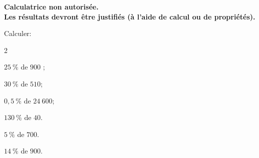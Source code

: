 \documentclass[11pt,a4paper]{article}  %
\begin{document}
	\graphicspath{{images/}}
	
	
	\vspace{.5cm}
	
	\begin{center}
		
		
	\end{center}

\begin{center}\textbf{Calculatrice non autorisée.\\Les résultats devront être justifiés (à l'aide de calcul ou de propriétés).}\end{center}




Calculer:
\begin{multicols}{2}
	\begin{enumMet}
		\item $25\ \%$ de $900$ ;
		\item $30\ \%$ de $510$;
		\item $0,5\ \%$ de $24\ 600$;
		\item $130\ \%$ de $40$.
		\item $5\ \%$ de $700$.
		\item $14\ \%$ de $900$.
	\end{enumMet}
\end{multicols}
\end{document}
